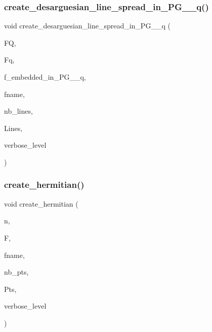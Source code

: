 \subsubsection{\texorpdfstring{create\+\_\+desarguesian\+\_\+line\+\_\+spread\+\_\+in\+\_\+\+P\+G\+\_\+\_\+q()}{create\_desarguesian\_line\_spread\_in\_PG\_3\_q()}}
{\footnotesize\ttfamily void create\+\_\+desarguesian\+\_\+line\+\_\+spread\+\_\+in\+\_\+\+P\+G\+\_\+\_\+q (\begin{DoxyParamCaption}\item[{\mbox{\hyperlink{classfinite__field}{finite\+\_\+field}} $\ast$}]{FQ,  }\item[{\mbox{\hyperlink{classfinite__field}{finite\+\_\+field}} $\ast$}]{Fq,  }\item[{\mbox{\hyperlink{galois_8h_a09fddde158a3a20bd2dcadb609de11dc}{I\+NT}}}]{f\+\_\+embedded\+\_\+in\+\_\+\+P\+G\+\_\+\_\+q,  }\item[{\mbox{\hyperlink{galois_8h_ab6cc7b4aeb6ea31aba2b3fbfc83ff5e6}{B\+Y\+TE}} $\ast$}]{fname,  }\item[{\mbox{\hyperlink{galois_8h_a09fddde158a3a20bd2dcadb609de11dc}{I\+NT}} \&}]{nb\+\_\+lines,  }\item[{\mbox{\hyperlink{galois_8h_a09fddde158a3a20bd2dcadb609de11dc}{I\+NT}} $\ast$\&}]{Lines,  }\item[{\mbox{\hyperlink{galois_8h_a09fddde158a3a20bd2dcadb609de11dc}{I\+NT}}}]{verbose\+\_\+level }\end{DoxyParamCaption})}

\mbox{\label{geometric__object_8_c_a55f161ce9981b4690fab656e5ba909f0}} 
\subsubsection{\texorpdfstring{create\+\_\+hermitian()}{create\_hermitian()}}
{\footnotesize\ttfamily void create\+\_\+hermitian (\begin{DoxyParamCaption}\item[{\mbox{\hyperlink{galois_8h_a09fddde158a3a20bd2dcadb609de11dc}{I\+NT}}}]{n,  }\item[{\mbox{\hyperlink{classfinite__field}{finite\+\_\+field}} $\ast$}]{F,  }\item[{\mbox{\hyperlink{galois_8h_ab6cc7b4aeb6ea31aba2b3fbfc83ff5e6}{B\+Y\+TE}} $\ast$}]{fname,  }\item[{\mbox{\hyperlink{galois_8h_a09fddde158a3a20bd2dcadb609de11dc}{I\+NT}} \&}]{nb\+\_\+pts,  }\item[{\mbox{\hyperlink{galois_8h_a09fddde158a3a20bd2dcadb609de11dc}{I\+NT}} $\ast$\&}]{Pts,  }\item[{\mbox{\hyperlink{galois_8h_a09fddde158a3a20bd2dcadb609de11dc}{I\+NT}}}]{verbose\+\_\+level }\end{DoxyParamCaption})}


